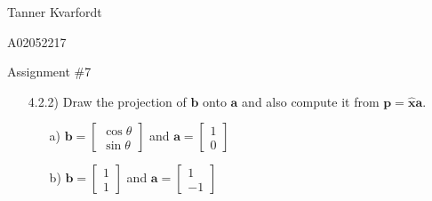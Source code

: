 \documentclass[12pt]{article}
\begin{document}
\hfill Tanner Kvarfordt

\hfill A02052217

\hfill Assignment \#7

\begin{itemize}
\item[4.2.2)] Draw the projection of $\mathbf{b}$ onto $\mathbf{a}$ and also compute it from $\mathbf{p}=\hat{\mathbf{x}}\mathbf{a}$.
\begin{itemize}
\item[a)] $\mathbf{b}=\left[\begin{array}{c} \cos\theta \\ \sin\theta \end{array}\right]$ and 
$\mathbf{a}=\left[\begin{array}{c} 1 \\ 0 \end{array}\right]$
\item[b)] $\mathbf{b}=\left[\begin{array}{c} 1 \\ 1 \end{array}\right]$ and 
$\mathbf{a}=\left[\begin{array}{r} 1 \\ -1 \end{array}\right]$
\end{itemize}


\end{itemize}
\end{document}
